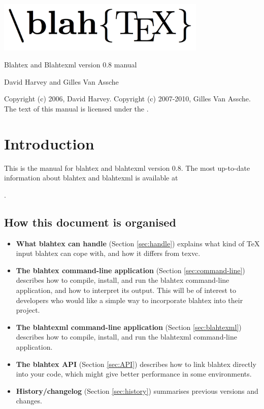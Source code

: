 \documentclass{article}
\newcommand{\blahtexversion}{0.8}
\begin{document}
\thispagestyle{empty}

\begin{center}
\includegraphics[width=10cm]{logo.png}

\vskip 1.6cm

{\Large Blahtex and Blahtexml version \blahtexversion{} manual}

\vskip 0.8cm

{\Large David Harvey} and {\Large Gilles Van Assche}
\end{center}

\vskip 1.6cm

{\footnotesize
Copyright (c) 2006, David Harvey.
Copyright (c) 2007-2010, Gilles Van Assche.
The text of this manual is licensed under the .}

\section{Introduction}

This is the manual for blahtex and blahtexml version \blahtexversion. The most up-to-date information about blahtex and blahtexml is available at
\begin{center}
.
\end{center}

\subsection{How this document is organised}

\begin{itemize}
\item {\bf What blahtex can handle} (Section \ref{sec:handle}) explains what kind of \TeX{} input blahtex can cope with, and how it differs from texvc.
\item {\bf The blahtex command-line application} (Section \ref{sec:command-line}) describes how to compile, install, and run the blahtex command-line application, and how to interpret its output. This will be of interest to developers who would like a simple way to incorporate blahtex into their project.
\item {\bf The blahtexml command-line application} (Section \ref{sec:blahtexml}) describes how to compile, install, and run the blahtexml command-line application.
\item {\bf The blahtex API} (Section \ref{sec:API}) describes how to link blahtex directly into your code, which might give better performance in some environments.
\item {\bf History/changelog} (Section \ref{sec:history}) summarises previous versions and changes.
\end{itemize}
\end{document}
